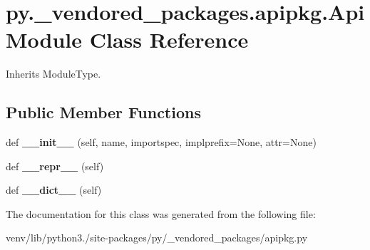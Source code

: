 \hypertarget{classpy_1_1__vendored__packages_1_1apipkg_1_1_api_module}{}\section{py.\+\_\+vendored\+\_\+packages.\+apipkg.\+Api\+Module Class Reference}
\label{classpy_1_1__vendored__packages_1_1apipkg_1_1_api_module}


Inherits Module\+Type.

\subsection*{Public Member Functions}
\begin{DoxyCompactItemize}
\item 
\mbox{\label{classpy_1_1__vendored__packages_1_1apipkg_1_1_api_module_a8679ce7825f870910218440feec503f7}} 
def {\bfseries \+\_\+\+\_\+init\+\_\+\+\_\+} (self, name, importspec, implprefix=None, attr=None)
\item 
\mbox{\label{classpy_1_1__vendored__packages_1_1apipkg_1_1_api_module_a0b99ff840488c96faf5af9e3a0d58e09}} 
def {\bfseries \+\_\+\+\_\+repr\+\_\+\+\_\+} (self)
\item 
\mbox{\label{classpy_1_1__vendored__packages_1_1apipkg_1_1_api_module_a3645cea970b8bcd46e13101d00af77a0}} 
def {\bfseries \+\_\+\+\_\+dict\+\_\+\+\_\+} (self)
\end{DoxyCompactItemize}


The documentation for this class was generated from the following file\+:\begin{DoxyCompactItemize}
\item 
venv/lib/python3./site-\/packages/py/\+\_\+vendored\+\_\+packages/apipkg.\+py\end{DoxyCompactItemize}
